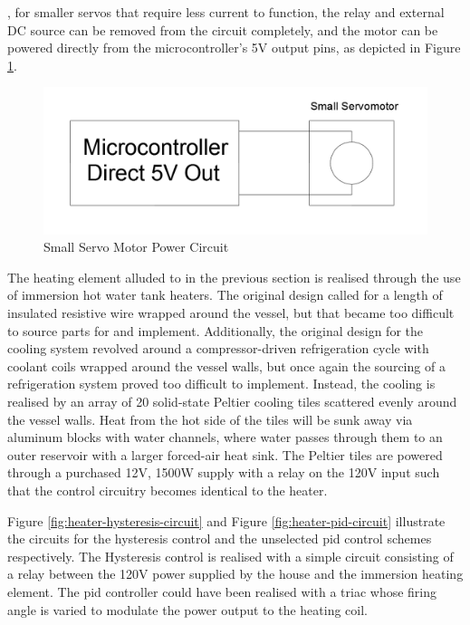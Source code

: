 \documentclass{article}
\begin{document}
, for smaller servos that require less current to function, the relay and external DC source can be removed from the circuit completely, and the motor can be powered directly from the microcontroller's 5V output pins, as depicted in Figure \ref{fig:servo-small-actuator-circuit}.

\begin{figure}[H]
\begin{center}
\includegraphics[scale=0.20]{servo-small-actuator-circuit.png}
\caption{Small Servo Motor Power Circuit}
\label{fig:servo-small-actuator-circuit}
\end{center}
\end{figure}

\noindent The heating element alluded to in the previous section is realised through the use of immersion hot water tank heaters. The original design called for a length of insulated resistive wire wrapped around the vessel, but that became too difficult to source parts for and implement. Additionally, the original design for the cooling system revolved around a compressor-driven refrigeration cycle with coolant coils wrapped around the vessel walls, but once again the sourcing of a refrigeration system proved too difficult to implement. Instead, the cooling is realised by an array of 20 solid-state Peltier cooling tiles scattered evenly around the vessel walls. Heat from the hot side of the tiles will be sunk away via aluminum blocks with water channels, where water passes through them to an outer reservoir with a larger forced-air heat sink. The Peltier tiles are powered through a purchased 12V, 1500W supply with a relay on the 120V input such that the control circuitry becomes identical to the heater.

\noindent Figure \ref{fig:heater-hysteresis-circuit} and Figure \ref{fig:heater-pid-circuit} illustrate the circuits for the hysteresis control and the unselected \gls{pid} control schemes respectively. The Hysteresis control is realised with a simple circuit consisting of a relay between the 120V power supplied by the house and the immersion heating element. The \gls{pid} controller could have been realised with a triac whose firing angle is varied to modulate the power output to the heating coil.
\end{document}
